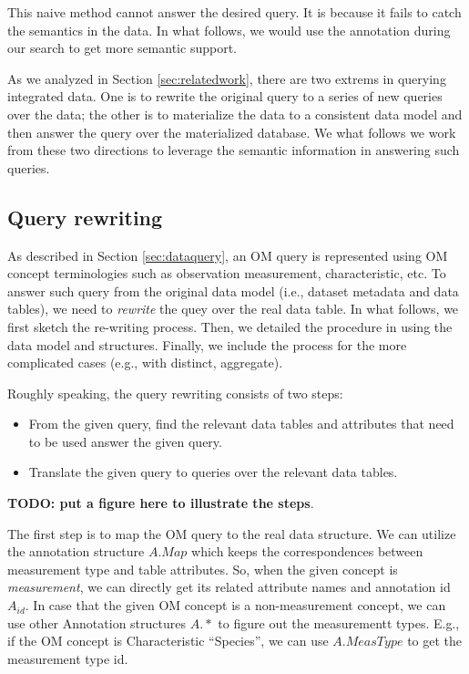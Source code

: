 \documentclass[conference]{IEEEtran}
\begin{document}
This naive method cannot answer the desired query. It is because it
fails to catch the semantics in the data. 
In what follows, we would use the annotation during our search to get
more semantic support. 

As we analyzed in Section \ref{sec:relatedwork}, there are two extrems
in querying integrated data. 
One is to rewrite the original query to a series of new queries over
the data; the other is to materialize the data to a consistent data
model and then answer the query over the materialized database. 
We what follows we work from these two directions to leverage the
semantic information in answering such queries. 

\subsection{Query rewriting}\label{sec:queryrewrite}

As described in Section \ref{sec:dataquery}, 
an OM query is represented using 
OM concept terminologies such as observation
measurement, characteristic, etc. 
To answer such query from the original data model (i.e., dataset
metadata and data tables), we need to {\em rewrite} the quey over the
real data table. 
In what follows, we first sketch the re-writing process. Then, we
detailed the procedure in using the data model and
structures. Finally, we include the process for the more complicated
cases (e.g., with distinct, aggregate). 

Roughly speaking, the query rewriting consists of two steps:
\begin{itemize}
\item From the given query, find the relevant data tables and
  attributes that need to be used answer the given query. 
\item Translate the given query to queries over the relevant data
  tables. 
\end{itemize}

{\bf TODO: put a figure here to illustrate the steps}. 

The first step is to map the OM query to the real data structure. 
We can utilize the annotation structure $A.Map$ which keeps the correspondences between
measurement type and table attributes. 
So, when the given concept is {\em measurement}, we can directly get
its related attribute names and annotation id $A_{id}$. 
In case that the given OM concept is a non-measurement concept, we can use
other Annotation structures $A.*$ to figure out the measurementt types. 
E.g., if the OM concept is Characteristic ``Species'', we can use
$A.MeasType$ to get the measurement type id. 
\end{document}
